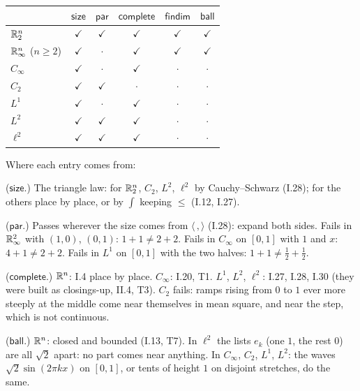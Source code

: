 \begin{center}
\renewcommand{\arraystretch}{1.3}
{\small
\setlength{\tabcolsep}{6pt}
\begin{tabular}{l|ccccc}
 & $\mathsf{size}$ & $\mathsf{par}$ & $\mathsf{complete}$ & $\mathsf{findim}$ & $\mathsf{ball}$ \\ \hline
$\mathbb{R}^n_2$ & $\checkmark$ & $\checkmark$ & $\checkmark$ & $\checkmark$ & $\checkmark$ \\
$\mathbb{R}^n_\infty$ ($n \ge 2$) & $\checkmark$ & $\cdot$ & $\checkmark$ & $\checkmark$ & $\checkmark$ \\
$C_\infty$ & $\checkmark$ & $\cdot$ & $\checkmark$ & $\cdot$ & $\cdot$ \\
$C_2$ & $\checkmark$ & $\checkmark$ & $\cdot$ & $\cdot$ & $\cdot$ \\
$L^1$ & $\checkmark$ & $\cdot$ & $\checkmark$ & $\cdot$ & $\cdot$ \\
$L^2$ & $\checkmark$ & $\checkmark$ & $\checkmark$ & $\cdot$ & $\cdot$ \\
$\ell^2$ & $\checkmark$ & $\checkmark$ & $\checkmark$ & $\cdot$ & $\cdot$ \\
\end{tabular}
}
\end{center}

Where each entry comes from:
\begin{lines}
\item[\lab{P1}] ($\mathsf{size}$.) The triangle law: for $\mathbb{R}^n_2$, $C_2$, $L^2$, $\ell^2$ by Cauchy--Schwarz (I.28); for the others place by place, or by $\int$ keeping $\le$ (I.12, I.27).
\item[\lab{P2}] ($\mathsf{par}$.) Passes wherever the size comes from $\langle\,,\rangle$ (I.28): expand both sides. Fails in $\mathbb{R}^2_\infty$ with $(1, 0)$, $(0, 1)$: $1 + 1 \ne 2 + 2$. Fails in $C_\infty$ on $[0, 1]$ with $1$ and $x$: $4 + 1 \ne 2 + 2$. Fails in $L^1$ on $[0, 1]$ with the two halves: $1 + 1 \ne \tfrac12 + \tfrac12$.
\item[\lab{P3}] ($\mathsf{complete}$.) $\mathbb{R}^n$: I.4 place by place. $C_\infty$: I.20, T1. $L^1$, $L^2$, $\ell^2$: I.27, I.28, I.30 (they were built as closings-up, II.4, T3). $C_2$ fails: ramps rising from $0$ to $1$ ever more steeply at the middle come near themselves in mean square, and near the step, which is not continuous.
\item[\lab{P4}] ($\mathsf{ball}$.) $\mathbb{R}^n$: closed and bounded (I.13, T7). In $\ell^2$ the lists $e_k$ (one $1$, the rest $0$) are all $\sqrt2$ apart: no part comes near anything. In $C_\infty$, $C_2$, $L^1$, $L^2$: the waves $\sqrt2 \sin(2\pi k x)$ on $[0, 1]$, or tents of height $1$ on disjoint stretches, do the same.
\end{lines}

